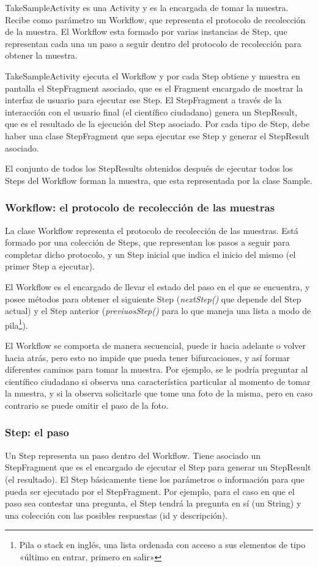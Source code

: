 TakeSampleActivity es una Activity y es la encargada de tomar la muestra.
Recibe como parámetro un Workflow, que representa el protocolo de recolección de la muestra.
El Workflow esta formado por varias instancias de Step, que representan cada una un paso a seguir dentro del protocolo de recolección para obtener la muestra.

TakeSampleActivity ejecuta el Workflow y por cada Step obtiene y muestra en pantalla el StepFragment asociado, que es el Fragment encargado de mostrar la interfaz de usuario para ejecutar ese Step. 
El StepFragment a través de la interacción con el usuario final (el científico ciudadano) genera un StepResult, que es el resultado de la ejecución del Step asociado. Por cada tipo de Step, debe haber una clase StepFragment que sepa ejecutar ese Step y generar el StepResult asociado.

El conjunto de todos los StepResults obtenidos después de ejecutar todos los Steps del Workflow forman la muestra, que esta representada por la clase Sample.


\subsubsection{Workflow: el protocolo de recolección de las muestras}
La clase Workflow representa el protocolo de recolección de las muestras. Está formado por una colección de Steps, que representan los pasos a seguir para completar dicho protocolo, y un Step inicial que indica el inicio del mismo (el primer Step a ejecutar).

El Workflow es el encargado de llevar el estado del paso en el que se encuentra, y posee métodos para obtener el siguiente Step (\textit{nextStep()}  que depende del Step actual) y el Step anterior (\textit{previuosStep()}  para lo que maneja una lista a modo de pila\footnote{Pila o stack en inglés, una lista ordenada con acceso a sus elementos de tipo «último en entrar, primero en salir»}).

El Workflow se comporta de manera secuencial, puede ir hacia adelante o volver hacia atrás, pero esto no impide que pueda tener bifurcaciones, y así formar diferentes caminos para tomar la muestra. Por ejemplo, se le podría preguntar al científico ciudadano si observa una característica particular al momento de tomar la muestra, y si la observa solicitarle que tome una foto de la misma, pero en caso contrario se puede omitir el paso de la foto.

\subsubsection{Step: el paso}
Un Step representa un paso dentro del Workflow. Tiene asociado un StepFragment que es el encargado de ejecutar el Step para generar un StepResult (el resultado). El Step básicamente tiene los parámetros o información para que pueda ser ejecutado por el StepFragment.
Por ejemplo, para el caso en que el paso sea contestar una pregunta, el Step tendrá la pregunta en sí (un String) y una colección con las posibles respuestas (id y descripción).

